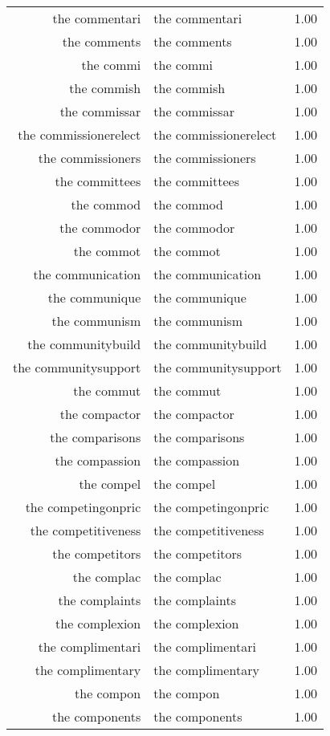 \begin{table}[ht]
\begin{tabular}{rlr}
  the commentari & the commentari & 1.00 \\ 
  the comments & the comments & 1.00 \\ 
  the commi & the commi & 1.00 \\ 
  the commish & the commish & 1.00 \\ 
  the commissar & the commissar & 1.00 \\ 
  the commissionerelect & the commissionerelect & 1.00 \\ 
  the commissioners & the commissioners & 1.00 \\ 
  the committees & the committees & 1.00 \\ 
  the commod & the commod & 1.00 \\ 
  the commodor & the commodor & 1.00 \\ 
  the commot & the commot & 1.00 \\ 
  the communication & the communication & 1.00 \\ 
  the communique & the communique & 1.00 \\ 
  the communism & the communism & 1.00 \\ 
  the communitybuild & the communitybuild & 1.00 \\ 
  the communitysupport & the communitysupport & 1.00 \\ 
  the commut & the commut & 1.00 \\ 
  the compactor & the compactor & 1.00 \\ 
  the comparisons & the comparisons & 1.00 \\ 
  the compassion & the compassion & 1.00 \\ 
  the compel & the compel & 1.00 \\ 
  the competingonpric & the competingonpric & 1.00 \\ 
  the competitiveness & the competitiveness & 1.00 \\ 
  the competitors & the competitors & 1.00 \\ 
  the complac & the complac & 1.00 \\ 
  the complaints & the complaints & 1.00 \\ 
  the complexion & the complexion & 1.00 \\ 
  the complimentari & the complimentari & 1.00 \\ 
  the complimentary & the complimentary & 1.00 \\ 
  the compon & the compon & 1.00 \\ 
  the components & the components & 1.00 \\ 

\end{tabular}
\end{table}
